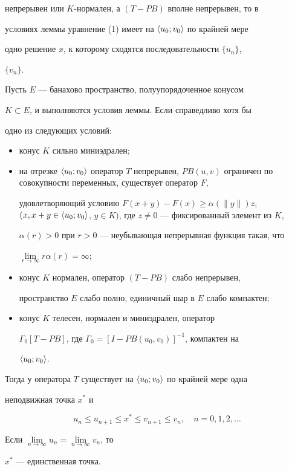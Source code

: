 непрерывен или $K$-нормален, а $(T-P B)$ вполне непрерывен, то в 


условиях леммы уравнение (1) имеет на $\langle u_0;v_0\rangle$ по крайней мере 


одно решение $x$, к которому сходятся последовательности $\{u_n\}$, 


$\{v_n\}$. 


 


\begin{thm} 


Пусть $E$ --- банахово пространство, полуупорядоченное конусом 


$K\subset E$, и выполняются условия леммы. Если справедливо хотя бы 


одно из следующих условий\/$:$ 


\begin{itemize} 


\item[а)] конус $K$ сильно миниэдрален\/$;$ 


\item[б)] на отрезке $\la u_0;v_0\ra$ оператор $T$ непрерывен, $P 


B(u,v)$ ограничен по совокупности переменных, существует оператор $F$, 


удовлетворяющий условию $F(x+y)-F(x)\ge\alpha(\|y\|)z$, $(x,x+y\in\la 


u_0;v_0\ra$, $y\in K)$, где $z\ne0$ --- фиксированный элемент из $K$, 


$\alpha(r)>0$ при $r>0$ --- неубывающая непрерывная функция такая, что 


$\lim\limits_{r\to\infty}r\alpha(r)=\infty;$ 


\item[в)] конус $K$ нормален, оператор $(T-P B)$ слабо непрерывен, 


пространство $E$ слабо полно, единичный шар в $E$ слабо компактен\/$;$ 


\item[г)] конус $K$ телесен, нормален и миниэдрален, оператор 


$\Gamma_0[T{-}P B]$, где $\Gamma_0{=}[I{-}P B(u_0,v_0)]^{-1}$, компактен на 


$\langle u_0;v_0\rangle$. 


\end{itemize} 


Тогда у оператора $T$ существует на $\langle u_0;v_0\rangle$ по крайней мере одна 


неподвижная точка $x^*$ и 


\begin{equation} 


u_n\le u_{n+1}\le x^*\le v_{n+1}\le v_n,\quad n=0,1,2,\dotsc 


\end{equation} 


Если $\lim\limits_{n\to\infty}u_n=\lim\limits_{n\to\infty}v_n$, то 


$x^*$ --- единственная точка. 


\end{thm} 


